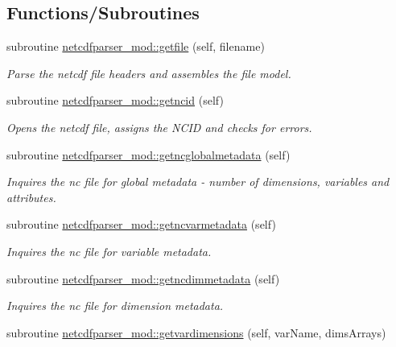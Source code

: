 \subsection*{Functions/\+Subroutines}
\begin{DoxyCompactItemize}
\item 
subroutine \mbox{\hyperlink{namespacenetcdfparser__mod_a57c39a4003778a6bf90cfd36b69380bc}{netcdfparser\+\_\+mod\+::getfile}} (self, filename)
\begin{DoxyCompactList}\small\item\em Parse the netcdf file headers and assembles the file model. \end{DoxyCompactList}\item 
subroutine \mbox{\hyperlink{namespacenetcdfparser__mod_a741dd5b5985255e73aa9d3cf08755e91}{netcdfparser\+\_\+mod\+::getncid}} (self)
\begin{DoxyCompactList}\small\item\em Opens the netcdf file, assigns the N\+C\+ID and checks for errors. \end{DoxyCompactList}\item 
subroutine \mbox{\hyperlink{namespacenetcdfparser__mod_a409f59662d71fb63e5fb5e057fdfd6ee}{netcdfparser\+\_\+mod\+::getncglobalmetadata}} (self)
\begin{DoxyCompactList}\small\item\em Inquires the nc file for global metadata -\/ number of dimensions, variables and attributes. \end{DoxyCompactList}\item 
subroutine \mbox{\hyperlink{namespacenetcdfparser__mod_a46989199271acb6205cc61ac413d5a56}{netcdfparser\+\_\+mod\+::getncvarmetadata}} (self)
\begin{DoxyCompactList}\small\item\em Inquires the nc file for variable metadata. \end{DoxyCompactList}\item 
subroutine \mbox{\hyperlink{namespacenetcdfparser__mod_a6354ee8b3c773cc7a5ad247ad1e34eeb}{netcdfparser\+\_\+mod\+::getncdimmetadata}} (self)
\begin{DoxyCompactList}\small\item\em Inquires the nc file for dimension metadata. \end{DoxyCompactList}\item 
subroutine \mbox{\hyperlink{namespacenetcdfparser__mod_a0aea819b8a474ce2f4840d0bc44e95ec}{netcdfparser\+\_\+mod\+::getvardimensions}} (self, var\+Name, dims\+Arrays)

\end{DoxyCompactItemize}
